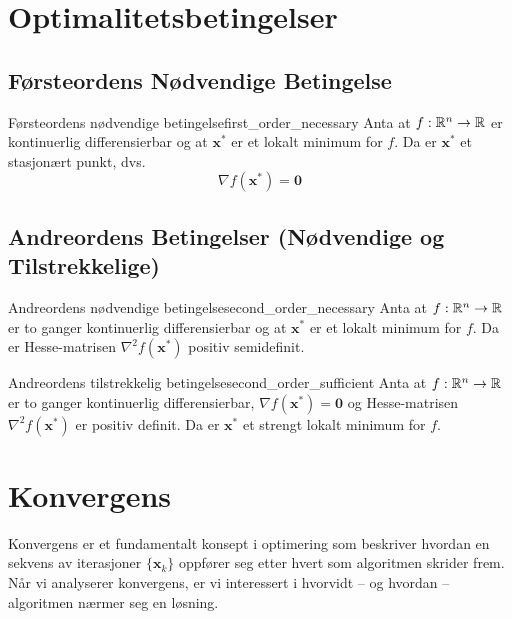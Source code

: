 \section{Optimalitetsbetingelser}

\subsection{Førsteordens Nødvendige Betingelse}

\begin{theorem}{Førsteordens nødvendige betingelse}{first_order_necessary}
	Anta at \(f: \mathbb{R}^n \to \mathbb{R}\) er kontinuerlig differensierbar og at \(\symbf{x}^\ast\) er et lokalt minimum for \(f\). Da er \(\symbf{x}^\ast\) et stasjonært punkt, dvs.
	\[
		\nabla f(\symbf{x}^\ast) = \symbf{0}
	\]
\end{theorem}

\subsection{Andreordens Betingelser (Nødvendige og Tilstrekkelige)}

\begin{theorem}{Andreordens nødvendige betingelse}{second_order_necessary}
	Anta at \(f: \mathbb{R}^n \to \mathbb{R}\) er to ganger kontinuerlig differensierbar og at \(\symbf{x}^\ast\) er et lokalt minimum for \(f\). Da er Hesse-matrisen \(\nabla^2 f(\symbf{x}^\ast)\) positiv semidefinit.
\end{theorem}

\begin{theorem}{Andreordens tilstrekkelig betingelse}{second_order_sufficient}
	Anta at \(f: \mathbb{R}^n \to \mathbb{R}\) er to ganger kontinuerlig differensierbar, \(\nabla f(\symbf{x}^\ast) = \symbf{0}\) og Hesse-matrisen \(\nabla^2 f(\symbf{x}^\ast)\) er positiv definit. Da er \(\symbf{x}^\ast\) et strengt lokalt minimum for \(f\).
\end{theorem}

\section{Konvergens}
\label{sec:convergence_theory}

Konvergens er et fundamentalt konsept i optimering som beskriver hvordan en sekvens av iterasjoner \(\{\symbf{x}_k\}\) oppfører seg etter hvert som algoritmen skrider frem. Når vi analyserer konvergens, er vi interessert i hvorvidt -- og hvordan -- algoritmen nærmer seg en løsning.

